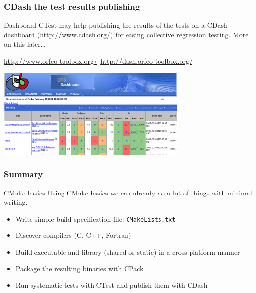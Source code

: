 \documentclass[compress,slidestop,table
              ]
               {beamer}
\newcommand{\fname}[1]{\texttt{#1}}
\begin{document}
\begin{frame}[fragile]
\frametitle{CDash the test results publishing}
\begin{block}{Dashboard}
CTest may help publishing the results of the tests
on a CDash dashboard (\url{http://www.cdash.org/}) 
for easing collective regression testing.
More on this later\ldots
\end{block}
\begin{center}
{\scriptsize
\url{http://www.orfeo-toolbox.org/}--\url{http://dash.orfeo-toolbox.org/}
}

\includegraphics[width=0.7\textwidth]{OrfeoToolboxDashBoard}
\end{center}
\end{frame}


\begin{frame}[fragile]
\frametitle{Summary}
\begin{block}{CMake basics}
Using CMake basics we can already do a lot of things with minimal writing.
\end{block}
\begin{itemize}
\item Write simple build specification file: \fname{CMakeLists.txt}
\item Discover compilers (C, C++, Fortran)
\item Build executable and library (shared or static) in a cross-platform manner
\item Package the resulting binaries with CPack
\item Run systematic tests with CTest and publish them with CDash
\end{itemize}
\end{frame}
\end{document}
